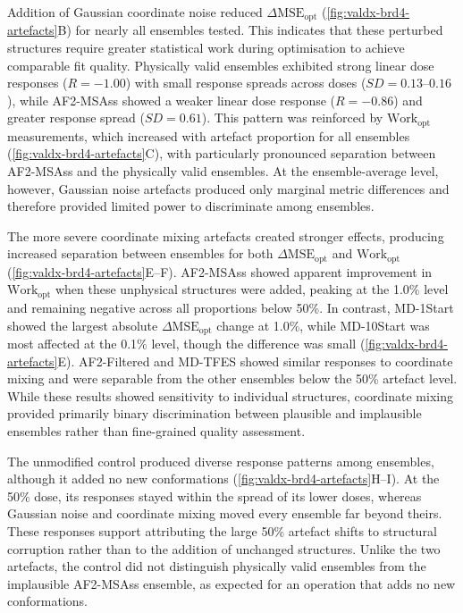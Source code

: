 Addition of Gaussian coordinate noise reduced $\Delta \text{MSE}_{\text{opt}}$ (\cref{fig:valdx-brd4-artefacts}B) for nearly all ensembles tested. This indicates that these perturbed structures require greater statistical work during optimisation to achieve comparable fit quality. Physically valid ensembles exhibited strong linear dose responses ($R=-1.00$) with small response spreads across doses ($SD=0.13$--$0.16$), while AF2-MSAss showed a weaker linear dose response ($R=-0.86$) and greater response spread ($SD=0.61$). This pattern was reinforced by $\text{Work}_{\text{opt}}$ measurements, which increased with artefact proportion for all ensembles (\cref{fig:valdx-brd4-artefacts}C), with particularly pronounced separation between AF2-MSAss and the physically valid ensembles. At the ensemble-average level, however, Gaussian noise artefacts produced only marginal metric differences and therefore provided limited power to discriminate among ensembles.

The more severe coordinate mixing artefacts created stronger effects, producing increased separation between ensembles for both $\Delta \text{MSE}_{\text{opt}}$ and $\text{Work}_{\text{opt}}$ (\cref{fig:valdx-brd4-artefacts}E--F). AF2-MSAss showed apparent improvement in $\text{Work}_{\text{opt}}$ when these unphysical structures were added, peaking at the 1.0\% level and remaining negative across all proportions below 50\%. In contrast, MD-1Start showed the largest absolute $\Delta \text{MSE}_{\text{opt}}$ change at 1.0\%, while MD-10Start was most affected at the 0.1\% level, though the difference was small (\cref{fig:valdx-brd4-artefacts}E). AF2-Filtered and MD-TFES showed similar responses to coordinate mixing and were separable from the other ensembles below the 50\% artefact level. While these results showed sensitivity to individual structures, coordinate mixing provided primarily binary discrimination between plausible and implausible ensembles rather than fine-grained quality assessment.

The unmodified control produced diverse response patterns among ensembles, although it added no new conformations (\cref{fig:valdx-brd4-artefacts}H--I). At the 50\% dose, its responses stayed within the spread of its lower doses, whereas Gaussian noise and coordinate mixing moved every ensemble far beyond theirs. These responses support attributing the large 50\% artefact shifts to structural corruption rather than to the addition of unchanged structures. Unlike the two artefacts, the control did not distinguish physically valid ensembles from the implausible AF2-MSAss ensemble, as expected for an operation that adds no new conformations.

